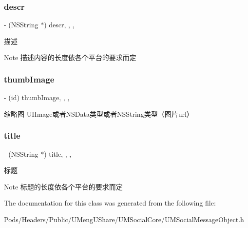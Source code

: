 \subsubsection{\texorpdfstring{descr}{descr}}
{\footnotesize\ttfamily -\/ (N\+S\+String $\ast$) descr\hspace{0.3cm}{\ttfamily [read]}, {\ttfamily [write]}, {\ttfamily [nonatomic]}, {\ttfamily [copy]}}

描述 \begin{DoxyNote}{Note}
描述内容的长度依各个平台的要求而定 
\end{DoxyNote}
\mbox{\label{interface_u_m_share_object_ac8c60ad664ac874bec56acd3304876fe}} 
\subsubsection{\texorpdfstring{thumb\+Image}{thumbImage}}
{\footnotesize\ttfamily -\/ (id) thumb\+Image\hspace{0.3cm}{\ttfamily [read]}, {\ttfamily [write]}, {\ttfamily [nonatomic]}, {\ttfamily [strong]}}

缩略图 U\+I\+Image或者\+N\+S\+Data类型或者\+N\+S\+String类型（图片url） \mbox{\label{interface_u_m_share_object_abe55135b8e383e429b961b04a1b459c0}} 
\subsubsection{\texorpdfstring{title}{title}}
{\footnotesize\ttfamily -\/ (N\+S\+String $\ast$) title\hspace{0.3cm}{\ttfamily [read]}, {\ttfamily [write]}, {\ttfamily [nonatomic]}, {\ttfamily [copy]}}

标题 \begin{DoxyNote}{Note}
标题的长度依各个平台的要求而定 
\end{DoxyNote}


The documentation for this class was generated from the following file\+:\begin{DoxyCompactItemize}
\item 
Pods/\+Headers/\+Public/\+U\+Meng\+U\+Share/\+U\+M\+Social\+Core/U\+M\+Social\+Message\+Object.\+h\end{DoxyCompactItemize}
